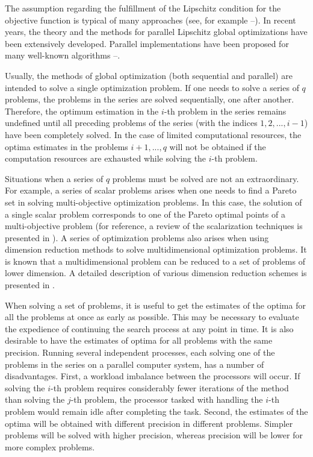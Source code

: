 \documentclass[smallcondensed]{svjour3}     %
\begin{document}
The assumption regarding the fulfillment of the Lipschitz condition for the objective function is typical of many approaches (see, for example \cite{Strongin2000}--\cite{Paulavicius2014}). In recent years, the theory and the methods for parallel Lipschitz global optimizations have been extensively developed. Parallel implementations have been proposed for many well-known algorithms \cite{Gergel2005}--\cite{Paulavicius2011}.

Usually, the methods of global optimization (both sequential and parallel) are intended to solve a single optimization problem. If one needs to solve a series of $q$ problems, the problems in the series are solved sequentially, one after another. Therefore, the optimum estimation in the $i$-th problem in the series remains undefined until all preceding problems of the series (with the indices $1, 2, ..., i-1$) have been completely solved. In the case of limited computational resources, the optima estimates in the problems $i+1,..., q$ will not be obtained if the computation resources are exhausted while solving the $i$-th problem.

Situations when a series of $q$ problems must be solved are not an extraordinary. For example, a series of scalar problems arises when one needs to find a Pareto set in solving multi-objective optimization problems. In this case, the solution of a single scalar problem corresponds to one of the Pareto optimal points of a multi-objective problem (for reference, a review of the scalarization techniques is presented in \cite{Ehrgott2005}). A series of optimization problems also arises when using dimension reduction methods to solve multidimensional optimization problems. It is known that a multidimensional problem can be reduced to a set of problems of lower dimension. A detailed description of various dimension reduction schemes is presented in \cite{Strongin2000,Sergeyev2013}. 

When solving a set of problems, it is useful to get the estimates of the optima for all the problems at once as early as possible. This may be necessary to evaluate the expedience of continuing the search process at any point in time. It is also desirable to have the estimates of optima for all problems with the same precision. Running several independent processes, each solving one of the problems in the series on a parallel computer system, has a number of disadvantages. First, a workload imbalance between the processors will occur. If solving the $i$-th problem requires considerably fewer iterations of the method than solving the $j$-th problem, the processor tasked with handling the $i$-th problem would remain idle after completing the task. Second, the estimates of the optima will be obtained with different precision in different problems. Simpler problems will be solved with higher precision, whereas precision will be lower for more complex problems. 
\end{document}
